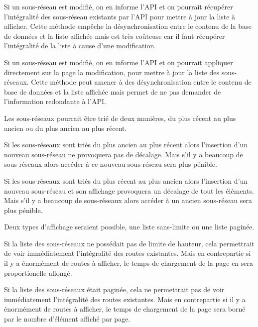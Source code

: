 Si un sous-réseau est modifié, on en informe l'API et on pourrait récupérer l'intégralité des sous-réseau existants par l'API pour mettre à jour la liste à afficher. Cette méthode empêche la désynchronisation entre le contenu de la base de données et la liste affichée mais est très coûteuse car il faut récupérer l'intégralité de la liste à cause d'une modification.

Si un sous-réseau est modifié, on en informe l'API et on pourrait appliquer directement sur la page la modification, pour mettre à jour la liste des sous-réseaux. Cette méthode peut amener à des désynchronisation entre le contenu de  base de données et la liste affichée mais permet de ne pas demander de l'information redondante à l'API.

Les sous-réseaux pourrait être trié de deux manières, du plus récent au plus ancien ou du plus ancien au plus récent.

Si les sous-réseaux sont triés du plus ancien au plus récent alors l'insertion d'un nouveau sous-réseau ne provoquera pas de décalage. Mais s'il y a beaucoup de sous-réseaux alors accéder à ce nouveau sous-réseau sera plus pénible.

Si les sous-réseaux sont triés du plus récent au plus ancien alors l'insertion d'un nouveau sous-réseau et son affichage provoquera un décalage de tout les éléments. Mais s'il y a beaucoup de sous-réseaux alors accéder à un ancien sous-réseau sera plus pénible. 

Deux types d'affichage seraient possible, une liste sans-limite ou une liste paginée.

Si la liste des sous-réseaux ne possédait pas de limite de hauteur, cela permettrait de voir immédiatement l'intégralité des routes existantes. Mais en contrepartie si il y a énormément de routes à afficher, le temps de chargement de la page en sera proportionelle allongé.

Si la liste des sous-réseaux était paginée, cela ne permettrait pas de voir immédiatement l'intégralité des routes existantes. Mais en contrepartie si il y a énormément de routes à afficher, le temps de chargement de la page sera borné par le nombre d'élément affiché par page.

